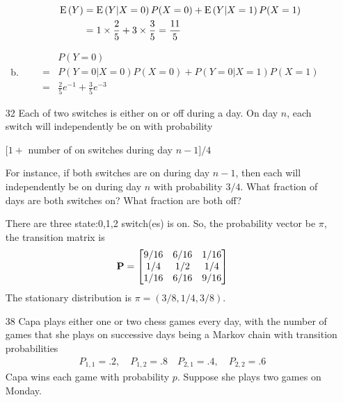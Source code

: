 \documentclass[en,hazy,blue,12pt,device = normal]{elegantnote}
\begin{document}
\begin{enumerate}
\begin{tcolorbox}
\begin{enumerate}[(a)]
            \begin{align*}
                \operatorname E\left(Y\right) &= \operatorname E\left(Y|X=0\right)P(X=0) + \operatorname E\left(Y|X=1\right) P(X=1) \\
                &= 1\times \frac 2 5 + 3\times \frac 3 5 = \frac{11}{5}
            \end{align*}
            \item \begin{align*}
                &P(Y = 0) \\
                =& P(Y = 0 | X = 0) P(X=0) + P(Y = 0|X=1)P(X=1) \\
                =& \frac 2 5 e^{-1} + \frac 3 5 e^{-3}
            \end{align*}
        \end{enumerate}
    \end{tcolorbox}

    \item[32] Each of two switches is either on or off during a day. On day \(n\), each switch will independently be on with probability
    \begin{center}
        \([1+\) number of on switches during day \(n-1] / 4\)
    \end{center}
    For instance, if both switches are on during day \(n-1\), then each will independently be on during day \(n\) with probability \(3 / 4\). What fraction of days are both switches on? What fraction are both off?
    \begin{tcolorbox}
        \sol

        There are three state:0,1,2 switch(es) is on. So, the probability vector be \(\pi\), the transition matrix is 
        \begin{align*}
            {\bf P} = \begin{bmatrix}
                9/16 & 6/16 & 1/16 \\
                1/4 & 1/2&1/4 \\
                1/16 & 6/16 & 9/16 
            \end{bmatrix}
        \end{align*}
        The stationary distribution is \(\pi = (3/8,1/4,3/8)\).
    \end{tcolorbox}
    \item[38] Capa plays either one or two chess games every day, with the number of games that she plays on successive days being a Markov chain with transition probabilities
    \begin{align*}
    P_{1,1}=.2, \quad P_{1,2}=.8 \quad P_{2,1}=.4, \quad P_{2,2}=.6
    \end{align*}
    Capa wins each game with probability \(p\). Suppose she plays two games on Monday.


\end{enumerate}
\end{document}
